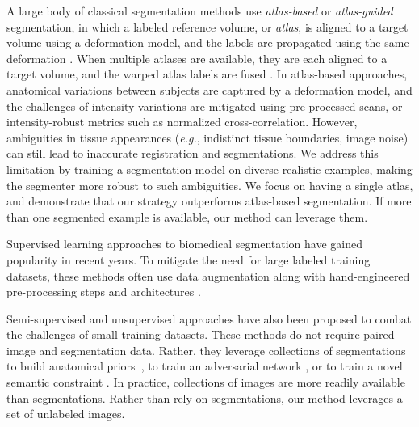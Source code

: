 \documentclass[10pt,twocolumn,letterpaper]{article}
\begin{document}
A large body of classical segmentation methods use \textit{atlas-based} or \textit{atlas-guided} segmentation, in which a labeled reference volume, or \textit{atlas}, is aligned to a target volume using a deformation model, and the labels are propagated using the same deformation \cite{baillard2001segmentation,ciofolo2009atlas,dawant1999automatic,hellier2004hierarchical}.  When multiple atlases are available, they are each aligned to a target volume, and the warped atlas labels are fused \cite{iglesias2015multi,klein2005mindboggle,sabuncu2010generative,wang2013multi}.  In atlas-based approaches, anatomical variations between subjects are captured by a deformation model, and the challenges of intensity variations are mitigated using pre-processed scans, or intensity-robust metrics such as normalized cross-correlation. However, ambiguities in tissue appearances (\textit{e.g.}, indistinct tissue boundaries, image noise) can still lead to inaccurate registration and segmentations. We address this limitation by training a segmentation model on diverse realistic examples, making the segmenter more robust to such ambiguities. We focus on having a single atlas, and demonstrate that our strategy outperforms atlas-based segmentation. If more than one segmented example is available, our method can leverage them.

Supervised learning approaches to biomedical segmentation have gained popularity in recent years. To mitigate the need for large labeled training datasets, these methods often use data augmentation along with hand-engineered pre-processing steps and architectures \cite{akkus2017deep,kamnitsas2017efficient,moeskops2016automatic,pereira2016brain,ronneberger2015u,roth2015deeporgan,zhang2015deep}. 

Semi-supervised and unsupervised approaches have also been proposed to combat the challenges of small training datasets. These methods do not require paired image and segmentation data. Rather, they leverage collections of segmentations to build anatomical priors~\cite{dalca2018anatomical}, to train an adversarial network \cite{joyce2018deep}, or to train a novel semantic constraint \cite{ganaye2018semi}. In practice, collections of images are more readily available than segmentations. Rather than rely on segmentations, our method leverages a set of unlabeled images. 
\end{document}
